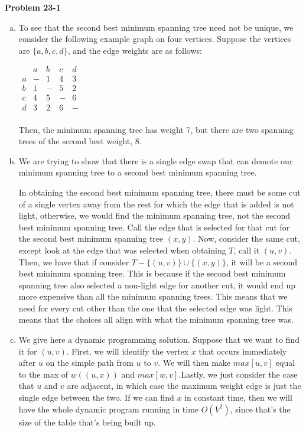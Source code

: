 \documentclass{article}
\begin{document}
\noindent\textbf{Problem 23-1}\\

\begin{enumerate}[a.]
\item
To see that the second best minimum spanning tree need not be unique, we consider the following example graph on four vertices. Suppose the vertices are $\{a,b,c,d\}$, and the edge weights are as follows:

$
\begin{array}{c|c|c|c|c|}
&a&b&c&d\\
\hline
a&-&1&4&3\\
\hline
b&1&-&5&2\\
\hline
c&4&5&-&6\\
\hline
d&3&2&6&-\\
\end{array}
$

Then, the minimum spanning tree has weight 7, but there are two spanning trees of the second best weight, 8.
\item
We are trying to show that there is a single edge swap that can demote our minimum spanning tree to a second best minimum spanning tree. 

In obtaining the second best minimum spanning tree, there must be some cut of a single vertex away from the rest for which the edge that is added is not light, otherwise, we would find the minimum spanning tree, not the second best minimum spanning tree. Call the edge that is selected for that cut for the second best minimum spanning tree $(x,y)$. Now, consider the same cut, except look at the edge that was selected when obtaining $T$, call it $(u,v)$. Then, we have that if consider $T - \{(u,v)\} \cup \{(x,y)\}$, it will be a second best minimum spanning tree. This is because if the second best minimum spanning tree also selected a non-light edge for another cut, it would end up more expensive than all the minimum spanning trees. This means that we need for every cut other than the one that the selected edge was light. This means that the choices all align with what the minimum spanning tree was.
\item
We give here a dynamic programming solution. Suppose that we want to find it for $(u,v)$. First, we will identify the vertex $x$ that occurs immediately after $u$ on the simple path from $u$ to $v$. We will then make $max[u,v]$ equal to the max of $w((u,x))$ and $max[w,v]$.Lastly, we just consider the case that $u$ and $v$ are adjacent, in which case the maximum weight edge is just the single edge between the two. If we can find $x$ in constant time, then we will have the whole dynamic program running in time $O(V^2)$, since that's the size of the table that's being built up. 


\end{enumerate}
\end{document}

